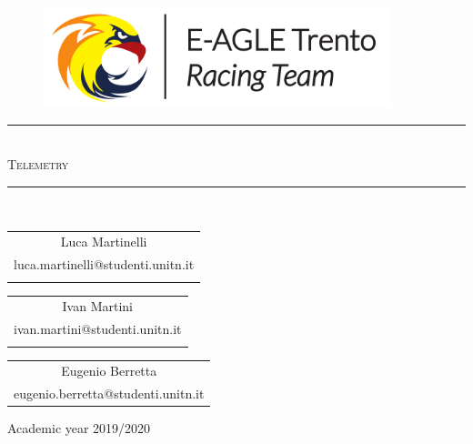 \pagestyle{plain}

\thispagestyle{empty}

\begin{center}
  \begin{figure}[h!]
    \centerline{\includegraphics[width=0.9\textwidth]{images/Logo_Anteriore.pdf}}
  \end{figure}
    
    \vspace{0.7 cm} 
    
    \rule{\linewidth}{0.2 mm} \\[1 cm]
  
  \Huge\textsc{Telemetry}
  
  \vspace{0.7 cm} 
  \rule{\linewidth}{0.2 mm} \\[1 cm]
  \vspace{0.7 cm}
    \begin{center}
        \begin{tabular}{c}
          Luca Martinelli\\
          luca.martinelli@studenti.unitn.it\\
          \rule{0pt}{1pt}
        \end{tabular}
        \begin{tabular}{c}
          Ivan Martini\\
          ivan.martini@studenti.unitn.it\\
          \rule{0pt}{1pt}
        \end{tabular}
        \begin{tabular}{c}
            Eugenio Berretta\\
            eugenio.berretta@studenti.unitn.it
        \end{tabular}
    \end{center}

  \vspace{2.7 cm} 

  \Large{Academic year 2019/2020}
  \\[1cm]
  
\end{center}

